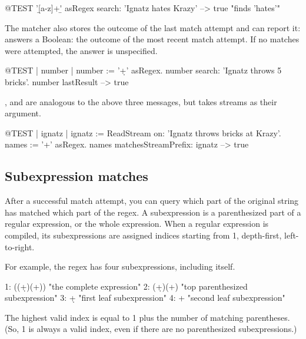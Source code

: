 \documentclass[a4paper,10pt,twoside]{book}
\begin{document}
{\begin{code}{@TEST}
'\b[a-z]+\b' asRegex search: 'Ignatz hates Krazy' --> true    "finds 'hates'"
\end{code}


The matcher also stores the outcome of the last match attempt and can report it:  answers a Boolean: the outcome of the most recent match attempt. If no matches were attempted, the answer is unspecified.

\begin{code}{@TEST | number |}
number := '\d+' asRegex.
number search: 'Ignatz throws 5 bricks'.
number lastResult --> true
\end{code}

,  and  are analogous to the above three messages, but takes streams as their argument.

\begin{code}{@TEST | ignatz |}
ignatz := ReadStream on: 'Ignatz throws bricks at Krazy'.
names := '\<[A-Z][a-z]+\>' asRegex.
names matchesStreamPrefix: ignatz --> true
\end{code}

\subsection{Subexpression matches}

After a successful match attempt, you can query which part of the original string has matched which part of the regex. A subexpression is a parenthesized part of a regular expression, or the whole expression. When a regular expression is compiled, its subexpressions are assigned indices starting from 1, depth-first, left-to-right.

For example, the regex \ct{((\\d+)\\s*(\\w+))} has four subexpressions, including itself.
\begin{code}{}
1:    ((\d+)\s*(\w+))    "the complete expression"
2:    (\d+)\s*(\w+)       "top parenthesized subexpression"
3:    \d+                      "first leaf subexpression"
4:    \w+                     "second leaf subexpression"
\end{code}

The highest valid index is equal to 1 plus the number of matching parentheses.  (So, 1 is always a valid index, even if there are no parenthesized subexpressions.)

}
\end{document}
